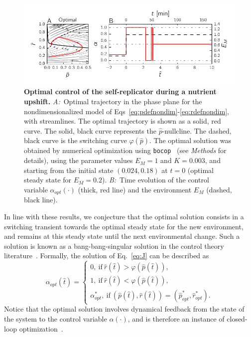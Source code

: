 \begin{figure}[tb]
\centering
\includegraphics[width=\textwidth]{./Fig/Fig4}
\caption{
\textbf{Optimal control of the self-replicator during a nutrient upshift.}
\textit{A:}~Optimal trajectory in the phase plane for the nondimensionalized model of Eqs~\ref{eq:pdefnondim}-\ref{eq:rdefnondim}, with streamlines. The optimal trajectory is shown as a solid, red curve.
The solid, black curve represents the $\hat{p}$-nullcline.
The dashed, black curve is the switching curve $\varphi(\hat{p})$.
The optimal solution was obtained by numerical optimization using \texttt{bocop}~\cite{bonnans_bocop_2012} (see \textit{Methods} for details), using the parameter values $E_M=1$ and $K=0.003$, and starting from the initial state $(0.024,0.18)$ at $t=0$ (optimal steady state for $E_M=0.2$).
\textit{B:}~Time evolution of the control variable $\alpha_{opt}(\cdot)$ (thick, red line) and the environment $E_M$ (dashed, black line).
}
\label{fig:optimalcontrol}
\end{figure}

In line with these results, we conjecture that the optimal solution consists in a switching transient towards the optimal steady state for the new environment, and remains at this steady state until the next environmental change.
Such a solution is known as a bang-bang-singular solution in the control theory literature~\cite{stengel_optimal_1994}.
Formally, the solution of Eq.~\ref{eq:J} can be described as
\begin{equation}
\label{eq:optcontrol}
\alpha_{opt}(\hat{t})=
\begin{cases}
0, \ \textrm{if} \ \hat{r}(\hat{t}) > \varphi(\hat{p}(\hat{t})),\\
1, \ \textrm{if} \ \hat{r}(\hat{t}) < \varphi(\hat{p}(\hat{t})), \\
\alpha^*_{opt}, \ \textrm{if} \ (\hat{p}(\hat{t}),\hat{r}(\hat{t}))=(\hat{p}_{opt}^*,\hat{r}_{opt}^*).
\end{cases}
\end{equation}
Notice that the optimal solution involves dynamical feedback from the state of the system to the control variable $\alpha(\cdot)$, and is therefore an instance of closed-loop optimization~\cite{stengel_optimal_1994}.

